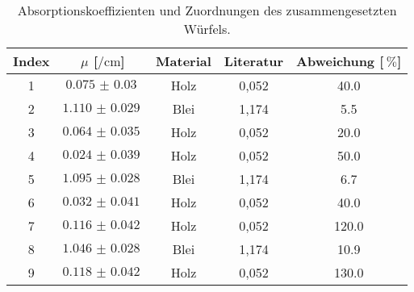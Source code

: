 \begin{table}
    \centering
    \caption{Absorptionskoeffizienten und Zuordnungen des zusammengesetzten Würfels.}
    \label{tab:wurfel4}
    \begin{tabular}{c c c c c}
      \toprule
      {Index} & $\mu$ [$\si{\per\centi\meter}$] & {Material}
                & Literatur & Abweichung [$\SI{}{\percent}$]\\
      \midrule
       1 & $\SI{0.075(30)}{}$ & Holz  & 0,052 & 40.0  \\
       2 & $\SI{1.110(29)}{}$ & Blei  & 1,174 & 5.5  \\
       3 & $\SI{0.064(35)}{}$ & Holz  & 0,052 & 20.0  \\
       4 & $\SI{0.024(39)}{}$ & Holz  & 0,052 & 50.0  \\
       5 & $\SI{1.095(28)}{}$ & Blei  & 1,174 & 6.7  \\
       6 & $\SI{0.032(41)}{}$ & Holz  & 0,052 & 40.0  \\
       7 & $\SI{0.116(42)}{}$ & Holz  & 0,052 &  120.0  \\
       8 & $\SI{1.046(28)}{}$ & Blei  & 1,174 & 10.9  \\
       9 & $\SI{0.118(42)}{}$ & Holz  & 0,052 & 130.0  \\
      \bottomrule
    \end{tabular}
\end{table}

